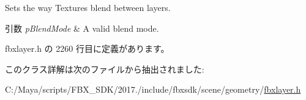 Sets the way Textures blend between layers. 
\begin{DoxyParams}{引数}
{\em p\+Blend\+Mode} & A valid blend mode. \\
\hline
\end{DoxyParams}


 fbxlayer.\+h の 2260 行目に定義があります。



このクラス詳解は次のファイルから抽出されました\+:\begin{DoxyCompactItemize}
\item 
C\+:/\+Maya/scripts/\+F\+B\+X\+\_\+\+S\+D\+K/2017./include/fbxsdk/scene/geometry/\hyperlink{fbxlayer_8h}{fbxlayer.\+h}\end{DoxyCompactItemize}
